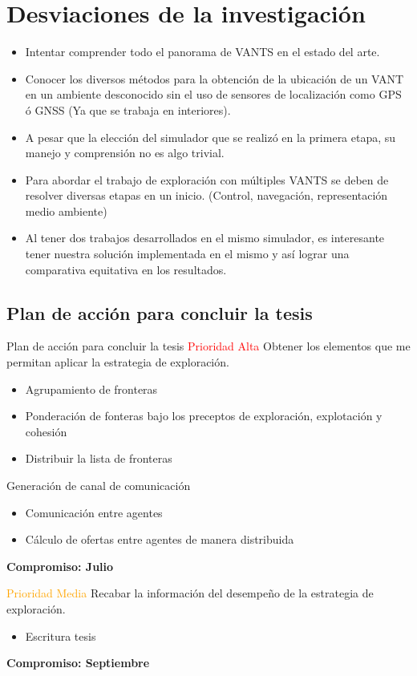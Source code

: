 \documentclass[24pt,aspectratio=169]{beamer}
\begin{document}
\section{Desviaciones de la investigación}
\begin{frame}
  \begin{itemize}
  \item Intentar comprender todo el panorama de VANTS en el estado del arte.
  \item Conocer los diversos métodos para la obtención de la ubicación de un VANT en un ambiente desconocido sin el uso de sensores de localización como GPS ó GNSS (Ya que se trabaja en interiores). 
  \item A pesar que la elección del simulador que se realizó en la primera etapa, su manejo y comprensión no es algo trivial.
  \item Para abordar el trabajo de exploración con múltiples VANTS se deben de resolver diversas etapas en un inicio. (Control, navegación, representación medio ambiente)
  \item Al tener dos trabajos desarrollados en el mismo simulador, es interesante tener nuestra solución implementada en el mismo y así lograr una comparativa equitativa en los resultados.
  \end{itemize}
\end{frame}

\subsection{Plan de acción para concluir la tesis}
\scriptsize
\begin{frame}{Plan de acción para concluir la tesis}
  \textcolor{red}{Prioridad Alta} Obtener los elementos que me permitan aplicar la estrategia de exploración.
  \begin{itemize}
  \item Agrupamiento de fronteras
  \item Ponderación de fonteras bajo los preceptos de exploración, explotación y cohesión
  \item Distribuir la lista de fronteras
  \end{itemize}

  Generación de canal de comunicación
  \begin{itemize}
  \item Comunicación entre agentes
  \item Cálculo de ofertas entre agentes de manera distribuida
  \end{itemize}

  \textbf{Compromiso: Julio}
  
  \textcolor{orange}{Prioridad Media} Recabar la información del desempeño de la estrategia de exploración.
  \begin{itemize}
    \item Escritura tesis
  \end{itemize}
  \textbf{Compromiso: Septiembre}
\end{frame}
\end{document}
